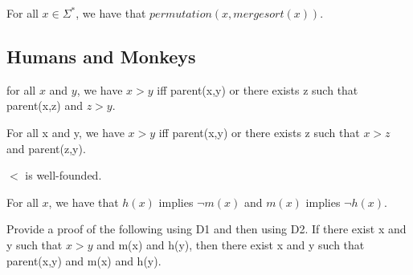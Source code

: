 \begin{theorem}[Homework] For all $x \in \Sigma^*$, we have that $permutation(x, mergesort(x))$.
\end{theorem}

\subsection{Humans and Monkeys}


\begin{definition}[D1] for all $x$ and $y$, we have $x > y$ iff parent(x,y) or there exists z such that parent(x,z) and $z > y$.
\end{definition}
\begin{definition}[D2] For all x and y, we have $x > y$ iff parent(x,y) or there exists z such that $x > z$ and parent(z,y).
\end{definition}

\begin{axiom} $<$ is well-founded.
\end{axiom}

\begin{axiom}For all $x$, we have that $h(x)$ implies $\neg m(x)$ and $m(x)$ implies $\neg h(x)$.
\end{axiom}


\begin{theorem}[Homework] Provide a proof of the following using D1 and then using D2. If there exist x and y such that $x > y$ and m(x) and h(y), then there exist x and y such that parent(x,y) and m(x) and h(y).
\end{theorem}